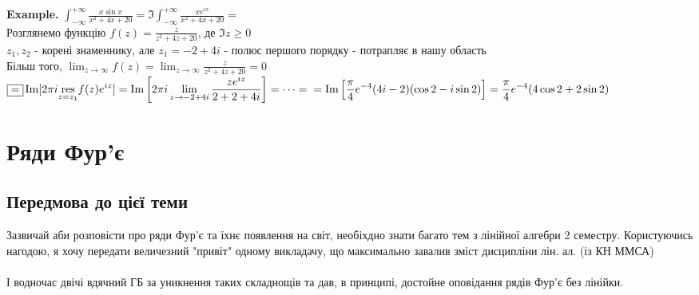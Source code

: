 \documentclass[a4paper, 10pt]{article}
\def\residue#1#2{\underset{z = {#1}}{\textrm{res}} {#2}}
\theoremstyle{theoremdd}
\theoremstyle{theoremdd}
\theoremstyle{theoremdd}
\theoremstyle{theoremdd}
\theoremstyle{theoremdd}
\theoremstyle{theoremdd}
\theoremstyle{theoremdd}
\theoremstyle{theoremdd}
\begin{document}
\textbf{Example.} $\displaystyle \int_{-\infty}^{+\infty} \frac{x \sin x}{x^2+4x+20} = \Im \int_{-\infty}^{+\infty} \frac{x e^{ix}}{x^2+4x+20} \boxed{=}$\\
Розглянемо функцію $\displaystyle f(z) = \frac{z}{z^2+4z+20}$, де $\Im z \geq 0$ \\
$z_1, z_2$ - корені знаменнику, але $z_1 = -2 + 4i$ - полюс першого порядку - потрапляє в нашу область\\
Більш того, $\displaystyle \lim_{z \to \infty} f(z) = \lim_{z \to \infty} \frac{z}{z^2+4z+20} = 0$\\
$\displaystyle \boxed{=} \Im[ 2\pi i \residue{z_1}{f(z)e^{iz}}] = \Im\left[ 2\pi i \lim_{z \to -2+4i} \frac{ze^{iz}}{2+2+4i}\right] = \dots = \\ = \Im\left[ \frac{\pi}{4} e^{-4} (4i-2)(\cos 2 - i \sin 2) \right] = \frac{\pi}{4}e^{-4} (4\cos 2 + 2 \sin 2)$
\newpage




\section{Ряди Фур'є}
\subsection*{Передмова до цієї теми}
Зазвичай аби розповісти про ряди Фур'є та їхнє появлення на світ, необіхдно знати багато тем з лінійної алгебри 2 семестру. Користуючись нагодою, я хочу передати величезний "привіт"  одному викладачу, що максимально завалив зміст дисципліни лін. ал. (із КН ММСА)\\
\\
І водночас двічі вдячний ГБ за уникнення таких складнощів та дав, в принципі, достойне оповідання рядів Фур'є без лінійки.\\
 
\end{document}
